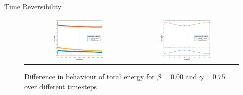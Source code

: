\documentclass{beamer}
\begin{document}
\begin{frame}{Time Reversibility}
 {
	\begin{figure}
		\centering
 		\begin{tabular}{@{}cc@{}}
    			\includegraphics[width=0.5\textwidth]{time_reversible_b0,0g0,75_1000_energy.eps} &
    			\includegraphics[width=0.5\textwidth]{time_reversible_b0,0g0,75_50_energy.eps} \\
		\end{tabular}
  		\caption{Difference in behaviour of total  energy for $\beta = 0.00$ and $\gamma = 0.75$ over different timesteps}
		\label{fig:time_reversible_b0.00g0.75_1000,50}
	\end{figure}
}


\end{frame}
\end{document}

